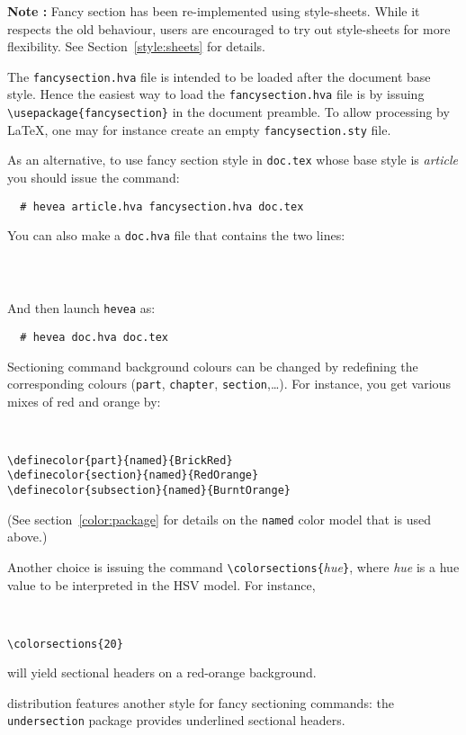 \textbf{Note : }Fancy section has been re-implemented using style-sheets. While it respects the old behaviour, users are encouraged to try out style-sheets for more flexibility. See Section~\ref{style:sheets} for details.


The \texttt{fancysection.hva} file is intended to be loaded after
the document base style.
Hence the easiest way to load the \texttt{fancysection.hva} file
is by issuing \verb+\usepackage{fancysection}+ in the document preamble.
To allow processing by \LaTeX, one may for instance create
an empty \texttt{fancysection.sty} file.

As an alternative, to use fancy section style in
\texttt{doc.tex} whose base style is \textit{article}
you should issue the command:
\begin{verbatim}
  # hevea article.hva fancysection.hva doc.tex
\end{verbatim}
You can also make a \texttt{doc.hva} file that contains the two lines:
\begin{verbatim}
  
  
\end{verbatim}
And then launch \texttt{hevea} as:
\begin{verbatim}
  # hevea doc.hva doc.tex
\end{verbatim}

Sectioning command background colours can be changed by
redefining the corresponding colours (\texttt{part}, \texttt{chapter},
\texttt{section},\ldots).
For instance, you get various mixes of red and orange by:
\begin{verbatim}


\definecolor{part}{named}{BrickRed}
\definecolor{section}{named}{RedOrange}
\definecolor{subsection}{named}{BurntOrange}
\end{verbatim}
(See section~\ref{color:package} for details on the \texttt{named}
color model that is used above.)

Another choice is issuing the command
\verb+\colorsections{+\textit{hue}\verb+}+, where
\textit{hue} is a hue value to be interpreted in the HSV model.
For instance,
\begin{verbatim}


\colorsections{20}
\end{verbatim}
will yield sectional headers on a red-orange background.

\hevea{} distribution features another style for fancy sectioning commands:
the \texttt{undersection} package provides underlined sectional headers.

